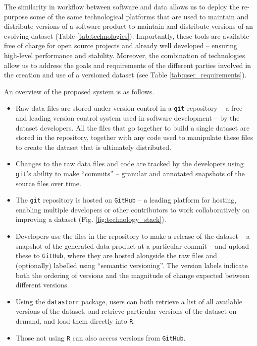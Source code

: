 \documentclass[a4paper,num-refs]{oup-contemporary}
\begin{document}
The similarity in workflow between software and data allows us to deploy the re-purpose some of the same technological platforms that are used to maintain and distribute versions of a software product to maintain and distribute versions of an evolving dataset (Table \ref{tab:technologies}). Importantly, these tools are available free of charge for open source projects and already well developed -- ensuring high-level performance and stability. Moreover, the combination of technologies allow us to address the goals and requirements of the different parties involved in the creation and use of a versioned dataset (see Table \ref{tab:user_requirements}). 

An overview of the proposed system is as follows.
\begin{itemize}
  \item Raw data files are stored under version control in a \texttt{git} repository --  a free and leading version control system used in software development -- by the dataset developers. All the files that go together to build a single dataset are stored in the repository, together with any code used to manipulate these files to create the dataset that is ultimately distributed.
  \item Changes to the raw data files and code are tracked by the developers using  \texttt{git}'s ability to make ``commits'' -- granular and annotated snapshots of the source files over time.
  \item The \texttt{git} repository is hosted on \texttt{GitHub} -- a leading platform for hosting, enabling multiple developers or other contributors to work collaboratively on improving a dataset (Fig. \ref{fig:technology_stack}).
  \item Developers use the files in the repository to make a release of the dataset -- a snapshot of the generated data product at a particular commit -- and upload these to \texttt{GitHub}, where they are hosted alongside the raw files and (optionally) labelled using ``semantic versioning''. The version labels indicate both the ordering of versions and the magnitude of change expected between different versions.
  \item Using the \texttt{datastorr} package, users can both retrieve a list of all available versions of the dataset, and retrieve particular versions of the dataset on demand, and load them directly into \texttt{R}. 
  \item Those not using \texttt{R} can also access versions from \texttt{GitHub}.
\end{itemize}
\end{document}
